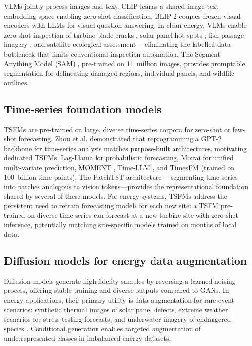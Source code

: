 \documentclass[preprint,12pt]{elsarticle}
\begin{document}
VLMs jointly process images and text. CLIP \cite{radford2021learning} learns a shared image-text embedding space enabling zero-shot classification; BLIP-2 \cite{li2023blip2} couples frozen visual encoders with LLMs for visual question answering. In clean energy, VLMs enable zero-shot inspection of turbine blade cracks \cite{memari2024blade_inspection_review}, solar panel hot spots \cite{thakfan2024solar_panel_defect}, fish passage imagery \cite{gregory2025fish_passage_dl}, and satellite ecological assessment \cite{pettorelli2024dl_satellite_biodiversity}---eliminating the labelled-data bottleneck that limits conventional inspection automation. The Segment Anything Model (SAM) \cite{kirillov2023sam}, pre-trained on 11~million images, provides promptable segmentation for delineating damaged regions, individual panels, and wildlife outlines.

\subsection{Time-series foundation models}
\label{subsec:tsfm}

TSFMs are pre-trained on large, diverse time-series corpora for zero-shot or few-shot forecasting. Zhou et al. \cite{zhou2023onefitsall} demonstrated that reprogramming a GPT-2 backbone for time-series analysis matches purpose-built architectures, motivating dedicated TSFMs: Lag-Llama \cite{rasul2023lagllama} for probabilistic forecasting, Moirai \cite{woo2024moirai} for unified multi-variate prediction, MOMENT \cite{goswami2024moment}, Time-LLM \cite{jin2024timellm}, and TimesFM \cite{das2024timesfm} (trained on 100~billion time points). The PatchTST architecture \cite{nie2023patchtst}---segmenting time series into patches analogous to vision tokens---provides the representational foundation shared by several of these models. For energy systems, TSFMs address the persistent need to retrain forecasting models for each new site: a TSFM pre-trained on diverse time series can forecast at a new turbine site with zero-shot inference, potentially matching site-specific models trained on months of local data.

\subsection{Diffusion models for energy data augmentation}
\label{subsec:diffusion}

Diffusion models \cite{ho2020denoising, rombach2022stablediffusion} generate high-fidelity samples by reversing a learned noising process, offering stable training and diverse outputs compared to GANs. In energy applications, their primary utility is data augmentation for rare-event scenarios: synthetic thermal images of solar panel defects, extreme weather scenarios for stress-testing forecasts, and underwater imagery of endangered species \cite{lin2024diffusion_ts}. Conditional generation enables targeted augmentation of underrepresented classes in imbalanced energy datasets.
\end{document}
